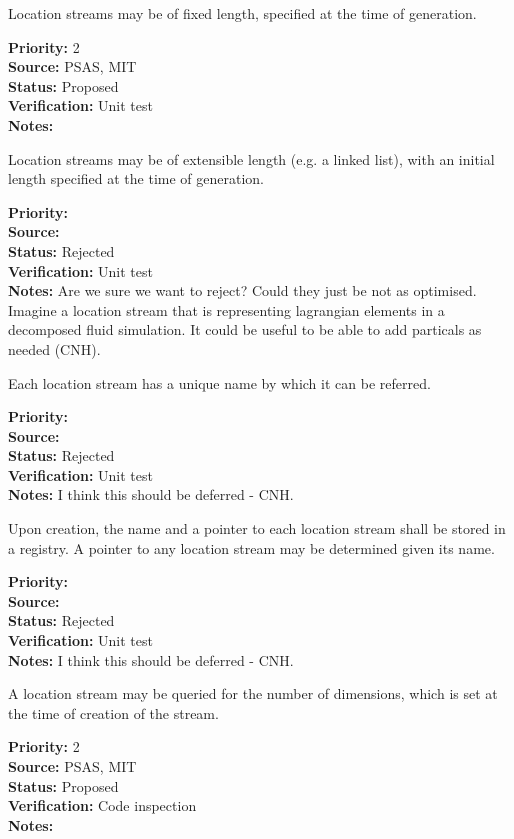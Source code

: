 Location streams may be of fixed length, specified at the time of generation.
\begin{reqlist}
{\bf Priority:} 2 \\
{\bf Source:} PSAS, MIT\\
{\bf Status:} Proposed \\
{\bf Verification:} Unit test\\
{\bf Notes:} 
\end{reqlist}

Location streams may be of extensible length (e.g. a linked list),
with an initial length specified at the time of generation.
\begin{reqlist}
{\bf Priority:} \\
{\bf Source:} \\
{\bf Status:} Rejected \\
{\bf Verification:} Unit test\\
{\bf Notes:} Are we sure we want to reject? Could they just be
not as optimised. Imagine a location stream that is representing lagrangian
elements in a decomposed fluid simulation. It could be useful to
be able to add particals as needed (CNH).
\end{reqlist}

Each location stream has a unique name by which it can be referred.
\begin{reqlist}
{\bf Priority:} \\
{\bf Source:} \\
{\bf Status:} Rejected \\
{\bf Verification:} Unit test \\
{\bf Notes:} I think this should be deferred - CNH.
\end{reqlist}

Upon creation, the name and a pointer to each location stream shall be stored in a
registry.  A pointer to any location stream may be determined given its name.
\begin{reqlist}
{\bf Priority:}  \\
{\bf Source:} \\
{\bf Status:} Rejected \\
{\bf Verification:} Unit test \\
{\bf Notes:} I think this should be deferred - CNH.
\end{reqlist}

A location stream may be queried for the number of dimensions, which is
set at the time of creation of the stream.
\begin{reqlist}
{\bf Priority:} 2 \\
{\bf Source:} PSAS, MIT\\
{\bf Status:} Proposed \\
{\bf Verification:} Code inspection \\
{\bf Notes:} 
\end{reqlist}

